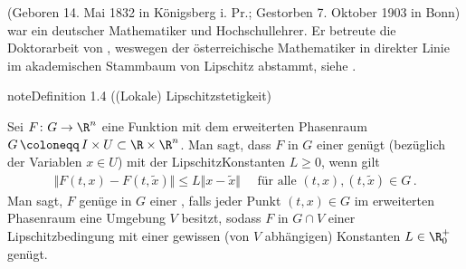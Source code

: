 \documentclass[letterpaper,10pt,english]{jupyterBook}
\begin{document}
\begin{sphinxShadowBox}

\sphinxAtStartPar
{} (Geboren 14. Mai 1832 in Königsberg i. Pr.; Gestorben 7. Oktober 1903 in Bonn) war ein deutscher Mathematiker und Hochschullehrer. Er betreute die Doktorarbeit von , weswegen der österreichische Mathematiker  in direkter Linie im akademischen Stammbaum von Lipschitz abstammt, siehe .
\end{sphinxShadowBox}
\label{ode/repetition:definition-8}
\begin{sphinxadmonition}{note}{Definition 1.4 ((Lokale) Lipschitzstetigkeit)}



\sphinxAtStartPar
Sei \(F \colon G \to \R^n\) eine Funktion mit dem erweiterten Phasenraum \(G \, \coloneqq \, I \times U \subset \R\times\R^n\).
Man sagt, dass \(F\) in \(G\) einer  genügt (bezüglich der Variablen \(x \in U\)) mit der Lipschitz\sphinxhyphen{}Konstanten \(L\geq0\), wenn gilt
\begin{equation*}
\begin{split}\Vert F(t,x) - F(t,\widetilde{x}) \Vert \leq L \Vert x-\widetilde{x}\Vert\quad\text{ für alle }(t,x), (t,\widetilde{x})\in G\,.\end{split}
\end{equation*}
\sphinxAtStartPar
Man sagt, \(F\) genüge in \(G\) einer , falls jeder Punkt \((t,x)\in G\) im erweiterten Phasenraum eine Umgebung \(V\) besitzt, sodass \(F\) in \(G\cap V\) einer Lipschitzbedingung mit einer gewissen (von \(V\) abhängigen) Konstanten \(L\in\R_0^+\) genügt.
\end{sphinxadmonition}
\end{document}
